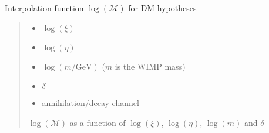 \documentclass[letterpaper,10pt,english]{sphinxmanual}
\begin{document}
\begin{fulllineitems}
\label{\detokenize{diffsph.spectra:diffsph.spectra.synchrotron.lMst_DM}}
\pysigstartsignatures
{}
\pysigstopsignatures
\sphinxAtStartPar
Interpolation function \(\log(\mathcal M)\) for DM hypotheses
\begin{quote}\begin{description}
\begin{itemize}
\item {} 
\sphinxAtStartPar
{} \textendash{} \(\log(\xi)\)

\item {} 
\sphinxAtStartPar
{} \textendash{} \(\log(\eta)\)

\item {} 
\sphinxAtStartPar
{} \textendash{} \(\log(m/\text{GeV})\) (\(m\) is the WIMP mass)

\item {} 
\sphinxAtStartPar
{} \textendash{} \(\delta\)

\item {} 
\sphinxAtStartPar
{} \textendash{} annihilation/decay channel

\end{itemize}

\sphinxAtStartPar
\(\log(\mathcal M)\) as a function of \(\log(\xi)\), \(\log(\eta)\), \(\log(m)\) and \(\delta\)

\end{description}\end{quote}

\end{fulllineitems}

\end{document}
